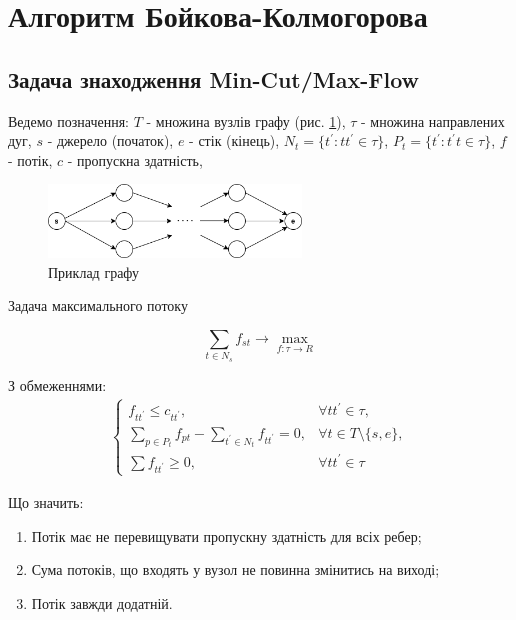 \section{Алгоритм Бойкова-Колмогорова}

\subsection{Задача знаходження Min-Cut/Max-Flow}

Ведемо позначення:
$T$ - множина вузлів графу (рис. \ref{fig:graph_example}),
$\tau$ - множина направлених дуг,
$s$ - джерело (початок),
$e$ - стік (кінець),
$N_t = \{t^{'}: tt^{'} \in \tau \}$,
$P_t = \{t^{'}: t^{'}t \in \tau \}$,
$f$ - потік,
$c$ - пропускна здатність,

\begin{figure}[h]
    \centering
    \includegraphics[width=0.6\textwidth]{images/graph_example}
    \caption{Приклад графу}
    \label{fig:graph_example}
\end{figure}

Задача максимального потоку

\begin{equation}
    \sum_{t \in N_s} f_{st} \rightarrow \max_{f: \tau \rightarrow R }
\end{equation}

З обмеженнями:
\begin{equation}
    \begin{gathered}
        \begin{cases}
            f_{tt^{'}} \leq  c_{tt^{'}},                                   & \forall tt^{'}  \in \tau ,         \\
            \sum_{p \in P_t} f_{pt} - \sum_{t^{'} \in N_t} f_{tt^{'}} = 0, & \forall t \in T \setminus \{s,e\}, \\
            \sum f_{tt^{'}} \geq 0,                                        & \forall tt^{'}  \in \tau
        \end{cases}
    \end{gathered}
\end{equation}

Що значить:
\begin{enumerate}
    \item Потік має не перевищувати пропускну здатність для всіх ребер;
    \item Сума потоків, що входять у вузол не повинна змінитись на виході;
    \item Потік завжди додатній.
\end{enumerate}

